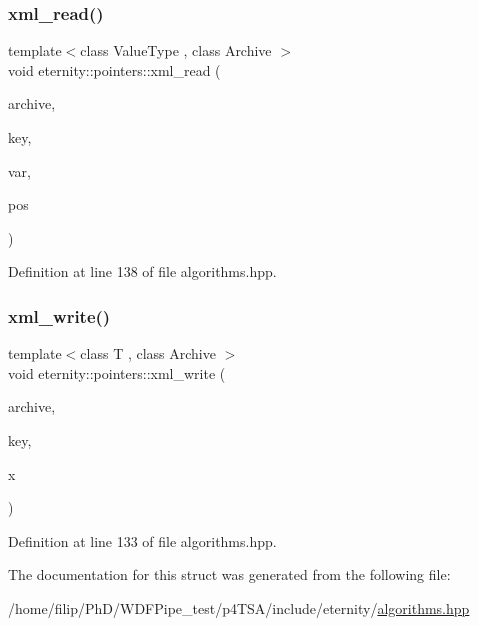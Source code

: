 \subsubsection{\texorpdfstring{xml\+\_\+read()}{xml\_read()}}
{\footnotesize\ttfamily template$<$class Value\+Type , class Archive $>$ \\
void eternity\+::pointers\+::xml\+\_\+read (\begin{DoxyParamCaption}\item[{Archive \&}]{archive,  }\item[{std\+::string}]{key,  }\item[{Value\+Type $\ast$}]{var,  }\item[{size\+\_\+t}]{pos }\end{DoxyParamCaption})}



Definition at line 138 of file algorithms.\+hpp.

\mbox{\label{structeternity_1_1pointers_a9ac5397bcf7d4e363f80c325b86e7966}} 
\subsubsection{\texorpdfstring{xml\+\_\+write()}{xml\_write()}}
{\footnotesize\ttfamily template$<$class T , class Archive $>$ \\
void eternity\+::pointers\+::xml\+\_\+write (\begin{DoxyParamCaption}\item[{Archive \&}]{archive,  }\item[{std\+::string}]{key,  }\item[{T \&}]{x }\end{DoxyParamCaption})}



Definition at line 133 of file algorithms.\+hpp.



The documentation for this struct was generated from the following file\+:\begin{DoxyCompactItemize}
\item 
/home/filip/\+Ph\+D/\+W\+D\+F\+Pipe\+\_\+test/p4\+T\+S\+A/include/eternity/\hyperlink{algorithms_8hpp}{algorithms.\+hpp}\end{DoxyCompactItemize}
